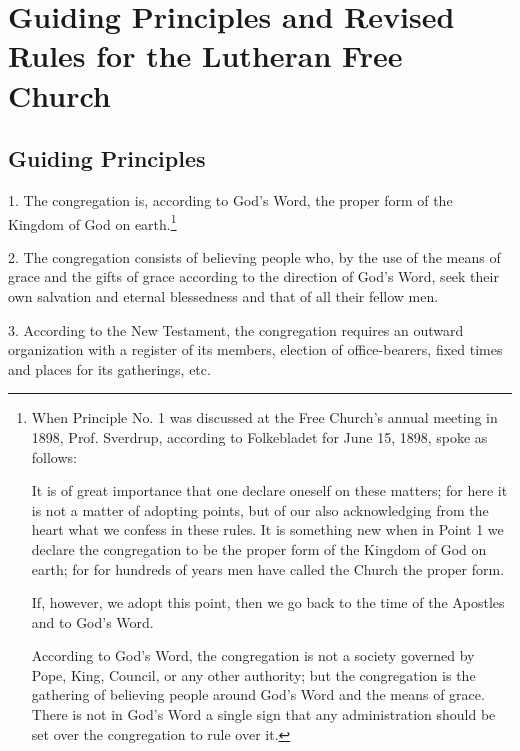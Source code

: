 
\section{Guiding Principles and Revised Rules for the Lutheran Free Church}

\subsection{Guiding Principles}

1. The congregation is, according to God’s Word, the proper form of the Kingdom of God on earth.\footnote{When Principle No. 1 was discussed at the Free Church’s annual meeting in 1898, Prof. Sverdrup, according to Folkebladet for June 15, 1898, spoke as follows:

It is of great importance that one declare oneself on these matters; for here it is not a matter of adopting points, but of our also acknowledging from the heart what we confess in these rules. It is something new when in Point 1 we declare the congregation to be the proper form of the Kingdom of God on earth; for for hundreds of years men have called the Church the proper form.

If, however, we adopt this point, then we go back to the time of the Apostles and to God’s Word.

According to God’s Word, the congregation is not a society governed by Pope, King, Council, or any other authority; but the congregation is the gathering of believing people around God’s Word and the means of grace. There is not in God’s Word a single sign that any administration should be set over the congregation to rule over it.}

2. The congregation consists of believing people who, by the use of the means of grace and the gifts of grace according to the direction of God’s Word, seek their own salvation and eternal blessedness and that of all their fellow men.

3. According to the New Testament, the congregation requires an outward organization with a register of its members, election of office-bearers, fixed times and places for its gatherings, etc.

